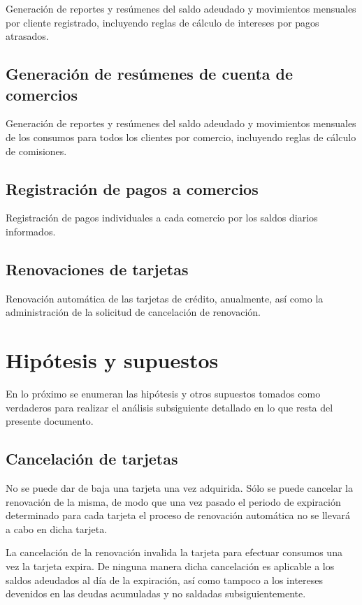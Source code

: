 Generación de reportes y resúmenes del saldo adeudado y movimientos mensuales
por cliente registrado, incluyendo reglas de cálculo de intereses por pagos
atrasados.

\subsection{Generación de resúmenes de cuenta de comercios}

Generación de reportes y resúmenes del saldo adeudado y movimientos mensuales de
los consumos para todos los clientes por comercio, incluyendo reglas de cálculo
de comisiones.

\subsection{Registración de pagos a comercios}

Registración de pagos individuales a cada comercio por los saldos diarios
informados.

\subsection{Renovaciones de tarjetas}

Renovación automática de las tarjetas de crédito, anualmente, así como la
administración de la solicitud de cancelación de renovación.


\section{Hipótesis y supuestos}

En lo próximo se enumeran las hipótesis y otros supuestos tomados como
verdaderos para realizar el análisis subsiguiente detallado en lo que resta del
presente documento.

\subsection{Cancelación de tarjetas}

No se puede dar de baja una tarjeta una vez adquirida. Sólo se puede cancelar la
renovación de la misma, de modo que una vez pasado el periodo de expiración
determinado para cada tarjeta el proceso de renovación automática no se llevará
a cabo en dicha tarjeta.

La cancelación de la renovación invalida la tarjeta para efectuar consumos una
vez la tarjeta expira. De ninguna manera dicha cancelación es aplicable a los
saldos adeudados al día de la expiración, así como tampoco a los intereses
devenidos en las deudas acumuladas y no saldadas subsiguientemente.

